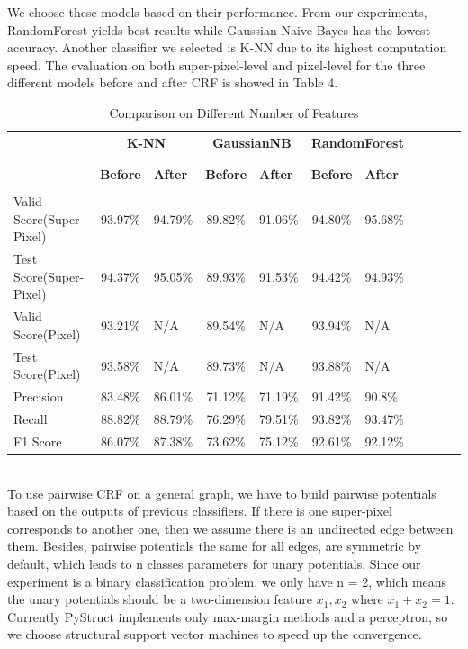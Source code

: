 \documentclass{article} %
\begin{document}
We choose these models based on their performance. From our experiments, RandomForest yields best results while Gaussian Naive Bayes has the lowest accuracy. Another classifier we selected is K-NN due to its highest computation speed. The evaluation on both super-pixel-level and pixel-level for the three different models before and after CRF is showed in Table 4. \\
\begin{table}[h]
\centering
\caption{Comparison on Different Number of Features}
\begin{tabular}{lclclclc|c|c|c|}
\\
&\multicolumn{2}{|c|}{\bf K-NN} & \multicolumn{2}{|c|}{\bf GaussianNB} & \multicolumn{2}{|c|}{\bf RandomForest} \\
\\ \hline \\
&\textbf{Before} &\textbf{After} &\textbf{Before} &\textbf{After} &\textbf{Before} &\textbf{After} \\
\\
Valid Score(Super-Pixel)	 &93.97\% &94.79\% &89.82\% &91.06\% &94.80\% &95.68\% \\
Test Score(Super-Pixel)	 &94.37\%	 &95.05\%	 &89.93\% &91.53\% &94.42\% &94.93\% \\
Valid Score(Pixel)	 &93.21\% &N/A &89.54\% &N/A &93.94\% &N/A \\
Test Score(Pixel)	 &93.58\%	 &N/A &89.73\% &N/A &93.88\% &N/A \\
Precision 		 &83.48\%	 &86.01\%	 &71.12\% &71.19\% &91.42\% &90.8\% \\
Recall 		 &88.82\%	 &88.79\%	 &76.29\% &79.51\% &93.82\% &93.47\% \\
F1 Score  	         &86.07\%	 &87.38\%	 &73.62\% &75.12\% &92.61\% &92.12\% \\
\end{tabular}
\end{table}
\\
To use pairwise CRF on a general graph, we have to build pairwise potentials based on the outputs of previous classifiers. If there is one super-pixel corresponds to another one, then we assume there is an undirected edge between them. Besides, pairwise potentials the same for all edges, are symmetric by default, which leads to n classes parameters for unary potentials. Since our experiment is a binary classification problem, we only have n = 2, which means the unary potentials should be a two-dimension feature ${x_1, x_2}$ where ${x_1 + x_2 = 1}$. Currently PyStruct implements only max-margin methods and a perceptron, so we choose structural support vector machines to speed up the convergence.\\
\end{document}
